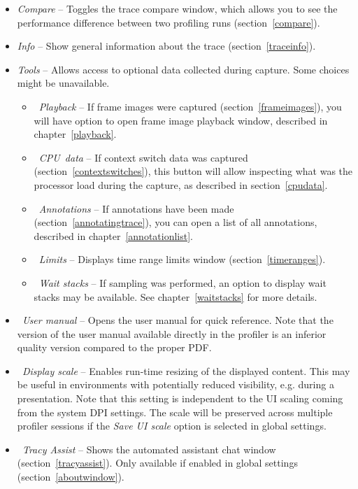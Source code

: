 \documentclass[hidelinks,titlepage,a4paper,twoside]{article}
\begin{document}
\begin{itemize}
\item \emph{\faBalanceScale{} Compare} -- Toggles the trace compare window, which allows you to see the performance difference between two profiling runs (section~\ref{compare}).
\item \emph{\faFingerprint{} Info} -- Show general information about the trace (section~\ref{traceinfo}).
\item \emph{\faTools{} Tools} -- Allows access to optional data collected during capture. Some choices might be unavailable.
\begin{itemize}
\item \emph{\faPlay{}~Playback} -- If frame images were captured (section~\ref{frameimages}), you will have option to open frame image playback window, described in chapter~\ref{playback}.
\item \emph{\faSlidersH{}~CPU~data} -- If context switch data was captured (section~\ref{contextswitches}), this button will allow inspecting what was the processor load during the capture, as described in section~\ref{cpudata}.
\item \emph{\faStickyNote{}~Annotations} -- If annotations have been made (section~\ref{annotatingtrace}), you can open a list of all annotations, described in chapter~\ref{annotationlist}.
\item \emph{\faRuler{}~Limits} -- Displays time range limits window (section~\ref{timeranges}).
\item \emph{\faHourglassHalf{}~Wait stacks} -- If sampling was performed, an option to display wait stacks may be available. See chapter~\ref{waitstacks} for more details.
\end{itemize}
\item \emph{ \faBook{}~User manual} -- Opens the user manual for quick reference. Note that the version of the user manual available directly in the profiler is an inferior quality version compared to the proper PDF.
\item \emph{\faSearchPlus{}~Display scale} -- Enables run-time resizing of the displayed content. This may be useful in environments with potentially reduced visibility, e.g. during a presentation. Note that this setting is independent to the UI scaling coming from the system DPI settings. The scale will be preserved across multiple profiler sessions if the \emph{Save UI scale} option is selected in global settings.
\item \emph{\faRobot{}~Tracy Assist} -- Shows the automated assistant chat window (section~\ref{tracyassist}). Only available if enabled in global settings (section~\ref{aboutwindow}).
\end{itemize}
\end{document}
